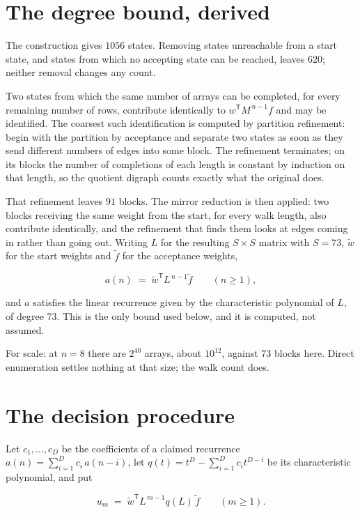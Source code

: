 \documentclass[11pt]{article}
\theoremstyle{definition}
\begin{document}
\section{The degree bound, derived}

The construction gives $1056$ states. Removing states unreachable from a start state, and states from which no accepting state can be reached, leaves $620$; neither removal changes any count.

Two states from which the same number of arrays can be completed, for every remaining number of rows, contribute identically to $w^{\mathsf T}M^{\,n-1}f$ and may be identified. The coarsest such identification is computed by partition refinement: begin with the partition by acceptance and separate two states as soon as they send different numbers of edges into some block. The refinement terminates; on its blocks the number of completions of each length is constant by induction on that length, so the quotient digraph counts exactly what the original does.

That refinement leaves $91$ blocks. The mirror reduction is then applied: two blocks receiving the same weight from the start, for every walk length, also contribute identically, and the refinement that finds them looks at edges coming in rather than going out. Writing $L$ for the resulting $S \times S$ matrix with $S = 73$, $\tilde w$ for the start weights and $\tilde f$ for the acceptance weights,

\[a(n) \;=\; \tilde w^{\mathsf T} L^{\,n-1} \tilde f \qquad (n \ge 1),\]

and $a$ satisfies the linear recurrence given by the characteristic polynomial of $L$, of degree $73$. This is the only bound used below, and it is computed, not assumed.

For scale: at $n = 8$ there are $2^{40}$ arrays, about $10^{12}$, against $73$ blocks here. Direct enumeration settles nothing at that size; the walk count does.

\section{The decision procedure}

Let $c_1,\dots,c_D$ be the coefficients of a claimed recurrence $a(n) = \sum_{i=1}^{D} c_i\,a(n-i)$, let $q(t) = t^{D} - \sum_{i=1}^{D} c_i t^{D-i}$ be its characteristic polynomial, and put

\[u_m \;=\; \tilde w^{\mathsf T} L^{\,m-1} q(L)\,\tilde f \qquad (m \ge 1).\]
\end{document}
